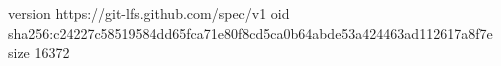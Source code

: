 version https://git-lfs.github.com/spec/v1
oid sha256:c24227c58519584dd65fca71e80f8cd5ca0b64abde53a424463ad112617a8f7e
size 16372

